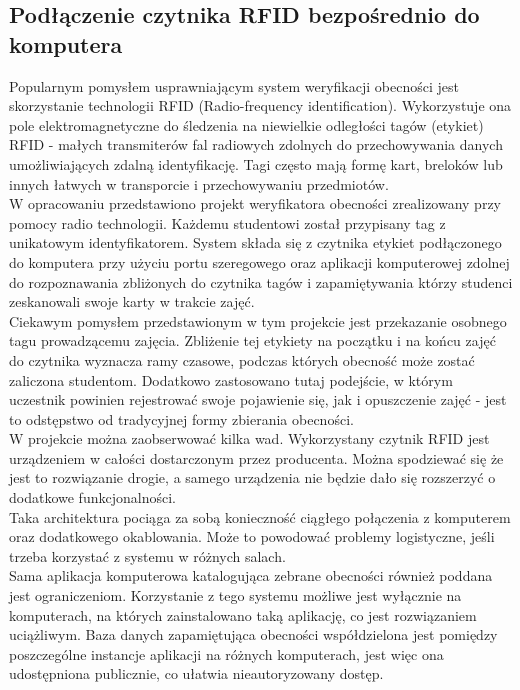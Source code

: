\documentclass[declaration,shortabstract, mgr]{iithesis}
\begin{document}
\subsection{Podłączenie czytnika RFID bezpośrednio do komputera}
\indent Popularnym pomysłem usprawniającym system weryfikacji obecności jest skorzystanie technologii RFID (Radio-frequency identification). Wykorzystuje ona pole elektromagnetyczne do śledzenia na niewielkie odległości tagów (etykiet) RFID\cite{rfid_itself} - małych transmiterów fal radiowych zdolnych do przechowywania danych umożliwiających zdalną identyfikację. Tagi często mają formę kart, breloków lub innych łatwych w transporcie i przechowywaniu przedmiotów.\\
\indent W opracowaniu \cite{rfid_serial} przedstawiono projekt weryfikatora obecności zrealizowany przy pomocy radio technologii. Każdemu studentowi został przypisany tag z unikatowym identyfikatorem. System składa się z czytnika etykiet podłączonego do komputera przy użyciu portu szeregowego oraz aplikacji komputerowej zdolnej do rozpoznawania zbliżonych do czytnika tagów i zapamiętywania którzy studenci zeskanowali swoje karty w trakcie zajęć. \\
\indent Ciekawym pomysłem przedstawionym w tym projekcie jest przekazanie osobnego tagu prowadzącemu zajęcia. Zbliżenie tej etykiety na początku i na końcu zajęć do czytnika wyznacza ramy czasowe, podczas których obecność może zostać zaliczona studentom. Dodatkowo zastosowano tutaj podejście, w którym uczestnik powinien rejestrować swoje pojawienie się, jak i opuszczenie zajęć - jest to odstępstwo od tradycyjnej formy zbierania obecności. \\
\indent W projekcie można zaobserwować kilka wad. Wykorzystany czytnik RFID jest urządzeniem w całości dostarczonym przez producenta. Można spodziewać się że jest to rozwiązanie drogie, a samego urządzenia nie będzie dało się rozszerzyć o dodatkowe funkcjonalności. \\
\indent Taka architektura pociąga za sobą konieczność ciągłego połączenia z komputerem oraz dodatkowego okablowania. Może to powodować problemy logistyczne, jeśli trzeba korzystać z systemu w różnych salach.\\
\indent Sama aplikacja komputerowa katalogująca zebrane obecności również poddana jest ograniczeniom. Korzystanie z tego systemu możliwe jest wyłącznie na komputerach, na których zainstalowano taką aplikację, co jest rozwiązaniem uciążliwym. Baza danych zapamiętująca obecności współdzielona jest pomiędzy poszczególne instancje aplikacji na różnych komputerach, jest więc ona udostępniona publicznie, co ułatwia nieautoryzowany dostęp.
\end{document}
